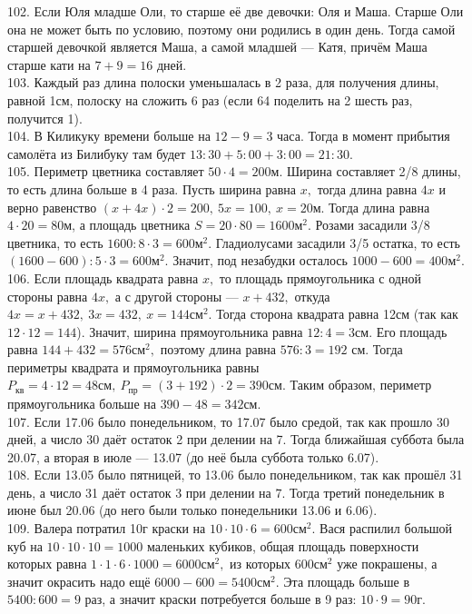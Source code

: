 102. Если Юля младше Оли, то старше её две девочки: Оля и Маша. Старше Оли она не может быть по условию, поэтому они родились в один день. Тогда самой старшей девочкой является Маша, а самой младшей --- Катя, причём Маша старше кати на $7+9=16$ дней.\\
103. Каждый раз длина полоски уменьшалась в 2 раза, для получения длины, равной 1см, полоску на сложить 6 раз (если 64 поделить на 2 шесть раз, получится 1).\\
104. В Киликуку времени больше на $12-9=3$ часа. Тогда в момент прибытия самолёта из Билибуку там будет $13:30+5:00+3:00=21:30.$\\
105. Периметр цветника составляет $50\cdot4=200$м. Ширина составляет 2/8 длины, то есть длина больше в 4 раза. Пусть ширина равна $x,$ тогда длина равна $4x$ и верно равенство $(x+4x)\cdot2=200,\ 5x=100,\ x=20$м. Тогда длина равна $4\cdot20=80$м, а площадь цветника $S=20\cdot80=1600\text{м}^2.$ Розами засадили 3/8 цветника, то есть $1600:8\cdot3=600\text{м}^2.$ Гладиолусами засадили 3/5 остатка, то есть $(1600-600):5\cdot3=600\text{м}^2.$ Значит, под незабудки осталось $1000-600=400\text{м}^2.$\\
106. Если площадь квадрата равна $x,$ то площадь прямоугольника с одной стороны равна $4x,$ а с другой стороны --- $x+432,$ откуда $4x=x+432,\ 3x=432,\ x=144\text{см}^2.$ Тогда сторона квадрата равна 12см (так как $12\cdot12=144$). Значит, ширина прямоугольника равна $12:4=3$см. Его площадь равна $144+432=576\text{см}^2,$ поэтому длина равна $576:3=192$ см. Тогда периметры квадрата и прямоугольника равны $P_\text{кв}=4\cdot12=48\text{см},\ P_\text{пр}=(3+192)\cdot2=390\text{см}.$ Таким образом, периметр прямоугольника больше на $390-48=342$см.\\
107. Если 17.06 было понедельником, то 17.07 было средой, так как прошло 30 дней, а число 30 даёт остаток 2 при делении на 7. Тогда ближайшая суббота была 20.07, а вторая в июле --- 13.07 (до неё была суббота только 6.07).\\
108. Если 13.05 было пятницей, то 13.06 было понедельником, так как прошёл 31 день, а число 31 даёт остаток 3 при делении на 7. Тогда третий понедельник в июне был 20.06 (до него были только понедельники 13.06 и 6.06).\\
109. Валера потратил 10г краски на $10\cdot10\cdot6=600\text{см}^2.$ Вася распилил большой куб на $10\cdot10\cdot10=1000$ маленьких кубиков, общая площадь поверхности которых равна $1\cdot1\cdot6\cdot1000=6000\text{см}^2,$ из которых $600\text{см}^2$ уже покрашены, а значит окрасить надо ещё $6000-600=5400\text{см}^2.$ Эта площадь больше в $5400:600=9$ раз, а значит краски потребуется больше в 9 раз: $10\cdot9=90$г.\\
